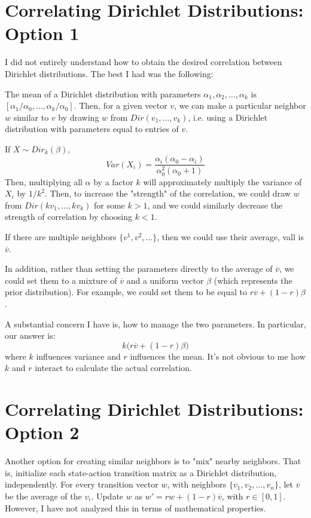\documentclass{article}
\begin{document}
\section{Correlating Dirichlet Distributions: Option 1}
I did not entirely understand how to obtain the desired correlation between Dirichlet distributions. The best I had was the following:

The mean of a Dirichlet distribution with parameters $\alpha_1, \alpha_2,\ldots,\alpha_k$ is $[\alpha_1/\alpha_0, \ldots,\alpha_k/\alpha_0]$. Then, for a given vector $v$, we can make a particular neighbor $w$ similar to $v$ by drawing $w$ from $Dir(v_1, \ldots, v_k)$, i.e. using a Dirichlet distribution with parameters equal to entries of $v$.

If $X\sim Dir_k(\beta)$,
$$Var(X_i) = \frac{\alpha_i(\alpha_0 - \alpha_i)}{\alpha_0^2(\alpha_0 + 1)}$$
Then, multiplying all $\alpha$ by a factor $k$ will approximately multiply the variance of $X_i$ by $1/k^2$. Then, to increase the "strength" of the correlation, we could draw $w$ from $Dir(kv_1, \ldots, kv_k)$ for some $k > 1$, and we could similarly decrease the strength of correlation by choosing $k < 1$.

If there are multiple neighbors $\{v^1, v^2, \ldots\}$, then we could use their average, vall is $\overline{v}$.

In addition, rather than setting the parameters directly to the average of $\overline{v}$, we could set them to a mixture of $\overline{v}$ and a uniform vector $\beta$ (which represents the prior distribution). For example, we could set them to be equal to $r\overline{v} + (1-r)\beta$.

A substantial concern I have is, how to manage the two parameters. In particular, our answer is:
$$k\bigg(r\overline{v} + (1-r)\beta\bigg)$$
where $k$ influences variance and $r$ influences the mean. It's not obvious to me how $k$ and $r$ interact to calculate the actual correlation.

\section{Correlating Dirichlet Distributions: Option 2}
Another option for creating similar neighbors is to "mix" nearby neighbors. That is, initialize each state-action transition matrix as a Dirichlet distribution, independently. For every transition vector $w$, with neighbors $\{v_1, v_2, \ldots, v_n\}$, let $\overline{v}$ be the average of the $v_i$. Update $w$ as $w' = rw + (1-r)\overline{v}$, with $r\in[0, 1]$. However, I have not analyzed this in terms of mathematical properties.
\end{document}
